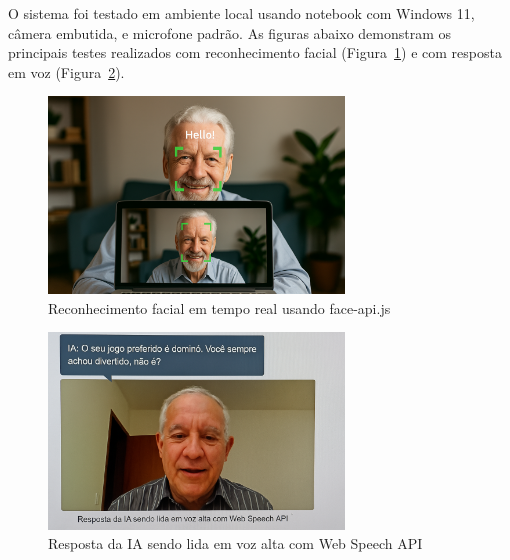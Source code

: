 O sistema foi testado em ambiente local usando notebook com Windows 11, câmera embutida, e microfone padrão. As figuras abaixo demonstram os principais testes realizados com reconhecimento facial (Figura~\ref{fig:face}) e com resposta em voz (Figura~\ref{fig:resposta}).

\begin{figure}[h]
\centering
\includegraphics[width=0.7\textwidth]{teste-reconhecimento-facial.png}
\caption{Reconhecimento facial em tempo real usando face-api.js}
\label{fig:face}
\end{figure}

\begin{figure}[h]
\centering
\includegraphics[width=0.7\textwidth]{resposta-audio-ia.png}
\caption{Resposta da IA sendo lida em voz alta com Web Speech API}
\label{fig:resposta}
\end{figure}

